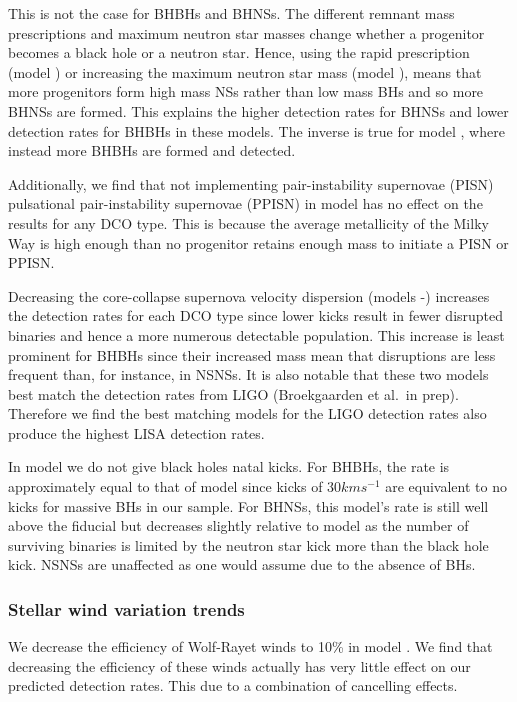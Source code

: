 This is not the case for BHBHs and BHNSs. The different remnant mass prescriptions and maximum neutron star masses change whether a progenitor becomes a black hole or a neutron star. Hence, using the rapid prescription (model \modRapid{}) or increasing the maximum neutron star mass (model \modNSHigh{}), means that more progenitors form high mass NSs rather than low mass BHs and so more BHNSs are formed. This explains the higher detection rates for BHNSs and lower detection rates for BHBHs in these models. The inverse is true for model \modNSLow{}, where instead more BHBHs are formed and detected.

Additionally, we find that not implementing pair-instability supernovae (PISN) pulsational pair-instability supernovae (PPISN) in model \modNoPISN{} has no effect on the results for any DCO type. This is because the average metallicity of the Milky Way is high enough than no progenitor retains enough mass to initiate a PISN or PPISN.

Decreasing the core-collapse supernova velocity dispersion (models \modSigLow{}-\modSigLower{}) increases the detection rates for each DCO type since lower kicks result in fewer disrupted binaries and hence a more numerous detectable population. This increase is least prominent for BHBHs since their increased mass mean that disruptions are less frequent than, for instance, in NSNSs. It is also notable that these two models best match the detection rates from LIGO (Broekgaarden et al.\ in prep). Therefore we find the best matching models for the LIGO detection rates also produce the highest LISA detection rates.

In model \modNoBH{} we do not give black holes natal kicks. For BHBHs, the rate is approximately equal to that of model \modSigLower{} since kicks of $30 \unit{km}{s^{-1}}$ are equivalent to no kicks for massive BHs in our sample. For BHNSs, this model's rate is still well above the fiducial but decreases slightly relative to model \modSigLower{} as the number of surviving binaries is limited by the neutron star kick more than the black hole kick. NSNSs are unaffected as one would assume due to the absence of BHs.

\subsubsection{Stellar wind variation trends}
We decrease the efficiency of Wolf-Rayet winds to 10\% in model \modWRLow{}. We find that decreasing the efficiency of these winds actually has very little effect on our predicted detection rates. This due to a combination of cancelling effects.


